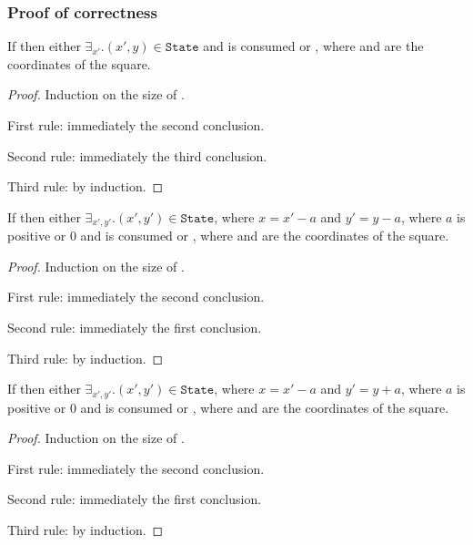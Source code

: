 \subsubsection{Proof of correctness}

\begin{lemma}

If  then either $\exists_{x'}. {(x',
y) \in \mathtt{State}}$ and  is consumed or
, where
 and  are the coordinates of the square.

\end{lemma}
\begin{proof}
Induction on the size of .

First rule: immediately the second conclusion.

Second rule: immediately the third conclusion.

Third rule: by induction.
\end{proof}

\begin{lemma}
If  then either $\exists_{x', y'}. {(x', y') \in \mathtt{State}}$, where $x = x' - a$ and $y' = y - a$, where $a$ is positive or $0$ and  is consumed or , where  and  are the coordinates of the square.
\end{lemma}
\begin{proof}
Induction on the size of .

First rule: immediately the second conclusion.

Second rule: immediately the first conclusion.

Third rule: by induction.
\end{proof}

\begin{lemma}
If  then either $\exists_{x', y'}. {(x', y') \in \mathtt{State}}$, where $x = x' - a$ and $y' = y + a$, where $a$ is positive or $0$ and  is consumed or , where  and  are the coordinates of the square.
\end{lemma}
\begin{proof}
Induction on the size of .

First rule: immediately the second conclusion.

Second rule: immediately the first conclusion.

Third rule: by induction.
\end{proof}


